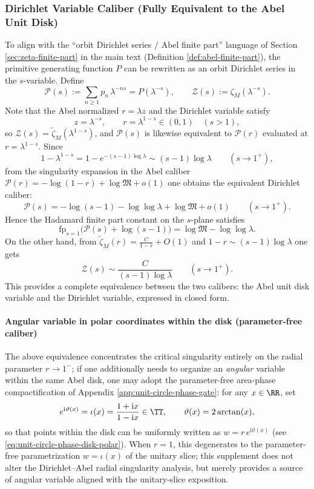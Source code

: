 \subsubsection{Dirichlet Variable Caliber (Fully Equivalent to the Abel Unit Disk)}\label{app:real-input-40-dirichlet}
To align with the ``orbit Dirichlet series / Abel finite part'' language of Section \ref{sec:zeta-finite-part} in the main text (Definition \ref{def:abel-finite-part}),
the primitive generating function $P$ can be rewritten as an orbit Dirichlet series in the $s$-variable. Define
\[
\mathcal{P}(s):=\sum_{n\ge 1}p_n\,\lambda^{-ns}=P(\lambda^{-s}),
\qquad
\mathcal{Z}(s):=\zeta_M(\lambda^{-s}).
\]
Note that the Abel normalized $r=\lambda z$ and the Dirichlet variable satisfy
\[
z=\lambda^{-s},\qquad r=\lambda^{1-s}\in(0,1)\quad(s>1),
\]
so $\mathcal{Z}(s)=\widetilde{\zeta}_M(\lambda^{1-s})$, and $\mathcal{P}(s)$ is likewise equivalent to $\mathcal{P}(r)$ evaluated at $r=\lambda^{1-s}$.
Since
\[
1-\lambda^{1-s}=1-e^{-(s-1)\log\lambda}\sim (s-1)\log\lambda\qquad(s\to 1^+),
\]
from the singularity expansion in the Abel caliber
\(
\mathcal{P}(r)=-\log(1-r)+\log\mathfrak{M}+o(1)
\)
one obtains the equivalent Dirichlet caliber:
\[
\mathcal{P}(s)=-\log(s-1)-\log\log\lambda+\log\mathfrak{M}+o(1)\qquad(s\to 1^+).
\]
Hence the Hadamard finite part constant on the $s$-plane satisfies
\[
\mathrm{fp}_{s=1}\bigl(\mathcal{P}(s)+\log(s-1)\bigr)=\log\mathfrak{M}-\log\log\lambda.
\]
On the other hand, from $\widetilde{\zeta}_M(r)=\frac{C}{1-r}+O(1)$ and $1-r\sim (s-1)\log\lambda$ one gets
\[
\mathcal{Z}(s)\sim \frac{C}{(s-1)\log\lambda}\qquad(s\to 1^+).
\]
This provides a complete equivalence between the two calibers: the Abel unit disk variable and the Dirichlet variable, expressed in closed form.

\paragraph{Angular variable in polar coordinates within the disk (parameter-free caliber)}
The above equivalence concentrates the critical singularity entirely on the radial parameter \(r\to 1^{-}\); if one additionally needs to organize an \emph{angular} variable within the same Abel disk, one may adopt the parameter-free area-phase compactification of Appendix \ref{app:unit-circle-phase-gate}: for any \(x\in\RR\), set
\[
e^{\mathrm{i}\vartheta(x)}=\iota(x)=\frac{1+\mathrm{i}x}{1-\mathrm{i}x}\in\TT,
\qquad
\vartheta(x)=2\arctan(x),
\]
so that points within the disk can be uniformly written as \(w=r\,e^{\mathrm{i}\vartheta(x)}\) (see \eqref{eq:unit-circle-phase-disk-polar}). When \(r=1\), this degenerates to the parameter-free parametrization \(w=\iota(x)\) of the unitary slice; this supplement does not alter the Dirichlet--Abel radial singularity analysis, but merely provides a source of angular variable aligned with the unitary-slice exposition.

